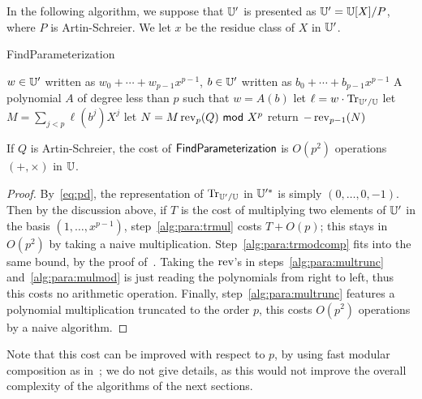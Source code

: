 In the following algorithm, we suppose that $\mathbb{U}'$ is presented as
$\mathbb{U}'=\mathbb{U}[X]/P$, where $P$ is Artin-Schreier. We let $x$ be the residue
class of $X$ in $\mathbb{U}'$.
\begin{algorithm}
  \caption{FindParameterization}
  \begin{algorithmic}[1]
    \REQUIRE $w \in \mathbb{U}'$ written as $w_0 + \cdots + w_{p-1} x^{p-1}$,  
    $b \in \mathbb{U}'$ written as $b_0 + \cdots + b_{p-1} x^{p-1}$
    \ENSURE A polynomial $A$ of degree less than $p$ such that $w=A(b)$
    \STATE\label{alg:para:trmul} let $\ell = w \cdot\operatorname{Tr}_{\mathbb{U}'/\mathbb{U}}$
    \STATE\label{alg:para:trmodcomp} let $M= \sum_{j < p}\ell(b^j)X^j$
    \STATE\label{alg:para:multrunc} let $N = M \operatorname{rev}_{p}(Q) {\sf ~mod~} X^{p}$
    \STATE\label{alg:para:mulmod} return $-\operatorname{rev}_{p-1}(N)$
  \end{algorithmic}
\end{algorithm}
\begin{proposition}
  \label{th:findparameterization}
  If $Q$ is Artin-Schreier, the cost of ${\sf FindParameterization}$ is
  $O(p^2)$ operations $(+,\times)$ in $\mathbb{U}$.
\end{proposition}
\begin{proof} By~\ref{eq:pd}, the representation of $\operatorname{Tr}_{\mathbb{U}'/\mathbb{U}}$ in
$\mathbb{U}'^\ast$ is simply $(0,\ldots,0,-1)$. Then by the discussion above,
if $T$ is the cost of multiplying two elements of $\mathbb{U}'$ in the basis
$(1,\ldots,x^{p-1})$, step~\ref{alg:para:trmul} costs $T + O(p)$; this
stays in $O(p^2)$ by taking a naive
multiplication. Step~\ref{alg:para:trmodcomp} fits into the same
bound, by the proof of~\cite[Th.~4]{Sho94}. Taking the $\operatorname{rev}$'s in
steps~\ref{alg:para:multrunc} and~\ref{alg:para:mulmod} is just
reading the polynomials from right to left, thus this costs no
arithmetic operation. Finally, step~\ref{alg:para:multrunc} features a
polynomial multiplication truncated to the order $p$, this costs
$O(p^2)$ operations by a naive algorithm.\end{proof}

Note that this cost can be improved with respect to $p$, by using fast
modular composition as in~\cite{Sho94}; we do not give details, as this
would not improve the overall complexity of the algorithms of the next
sections.


%
